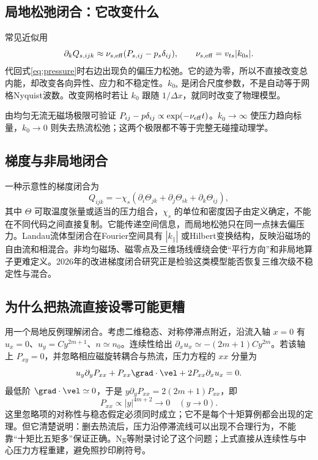 \subsection{局地松弛闭合：它改变什么}
常见近似用
\begin{equation}\partial_kQ_{s,ijk}\approx\nu_{s,\rm eff}(P_{s,ij}-p_s\delta_{ij}),\qquad
\nu_{s,\rm eff}=v_{ts}|k_{0s}|.\label{eq:localclosure}
\end{equation}
代回式\eqref{eq:pressure}时右边出现负的偏压力松弛。它的迹为零，所以不直接改变总内能，却改变各向异性、应力和不稳定性。$k_{0s}$ 是闭合尺度参数，不是自动等于网格Nyquist波数。改变网格时若让 $k_0$ 跟随 $1/\Delta x$，就同时改变了物理模型。

由均匀无流无磁场极限可验证 $P_{ij}-p\delta_{ij}\propto\exp(-\nu_{\rm eff}t)$。$k_0\to\infty$ 使压力趋向标量，$k_0\to0$ 则失去热流松弛；这两个极限都不等于完整无碰撞动理学。

\subsection{梯度与非局地闭合}
一种示意性的梯度闭合为
\begin{equation}Q_{ijk}=-\chi_s\left(\partial_i\Theta_{jk}+\partial_j\Theta_{ik}+\partial_k\Theta_{ij}\right),
\end{equation}
其中 $\Theta$ 可取温度张量或适当的压力组合，$\chi_s$ 的单位和密度因子由定义确定，不能在不同代码之间直接复制。它能传递空间信息，而局地松弛只在同一点抹去偏压力。Landau流体型闭合在Fourier空间具有 $|k_\parallel|$ 或Hilbert变换结构，反映沿磁场的自由流和相混合。非均匀磁场、磁零点及三维场线缠绕会使“平行方向”和非局地算子更难定义。2026年的改进梯度闭合研究正是检验这类模型能否恢复三维次级不稳定性与混合。\citep{Closure2026}

\subsection{为什么把热流直接设零可能更糟}
用一个局地反例理解闭合。考虑二维稳态、对称停滞点附近，沿流入轴 $x=0$ 有 $u_x=0$、$u_y=C y^{2m+1}$、$n\simeq n_0$。连续性给出
$\partial_xu_x\simeq-(2m+1)Cy^{2m}$。若该轴上 $P_{xy}=0$，并忽略相应磁旋转耦合与热流，压力方程的 $xx$ 分量为
\begin{equation}
u_y\partial_yP_{xx}+P_{xx}\grad\cdot\vel+2P_{xx}\partial_xu_x=0.
\end{equation}
最低阶 $\grad\cdot\vel\simeq0$，于是
$y\partial_yP_{xx}=2(2m+1)P_{xx}$，即
\begin{equation}P_{xx}\propto |y|^{4m+2}\longrightarrow0\quad(y\to0).
\end{equation}
这里忽略项的对称性与稳态假定必须同时成立；它不是每个十矩算例都会出现的定理。但它清楚说明：删去热流后，压力沿停滞流线可以出现不合理行为，不能靠“十矩比五矩多”保证正确。Ng等附录讨论了这个问题；上式直接从连续性与中心压力方程重建，避免照抄印刷符号。\citep{Ng2020}

